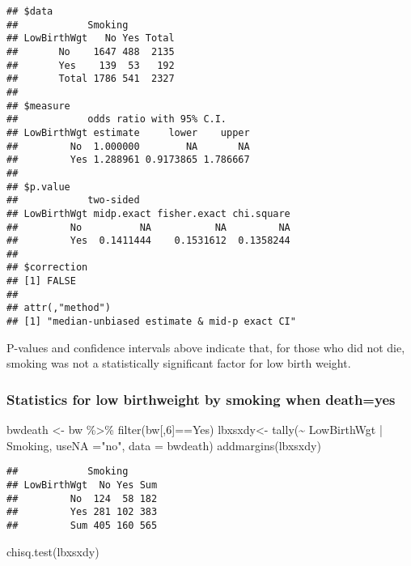\documentclass[
]{article}
\newenvironment{Shaded}{\begin{snugshade}}{\end{snugshade}}
\newcommand{\AttributeTok}[1]{\textcolor[rgb]{0.77,0.63,0.00}{#1}}
\newcommand{\DecValTok}[1]{\textcolor[rgb]{0.00,0.00,0.81}{#1}}
\newcommand{\FunctionTok}[1]{\textcolor[rgb]{0.00,0.00,0.00}{#1}}
\newcommand{\NormalTok}[1]{#1}
\newcommand{\OtherTok}[1]{\textcolor[rgb]{0.56,0.35,0.01}{#1}}
\newcommand{\SpecialCharTok}[1]{\textcolor[rgb]{0.00,0.00,0.00}{#1}}
\newcommand{\StringTok}[1]{\textcolor[rgb]{0.31,0.60,0.02}{#1}}
\begin{document}
\begin{verbatim}
## $data
##            Smoking
## LowBirthWgt   No Yes Total
##       No    1647 488  2135
##       Yes    139  53   192
##       Total 1786 541  2327
## 
## $measure
##            odds ratio with 95% C.I.
## LowBirthWgt estimate     lower    upper
##         No  1.000000        NA       NA
##         Yes 1.288961 0.9173865 1.786667
## 
## $p.value
##            two-sided
## LowBirthWgt midp.exact fisher.exact chi.square
##         No          NA           NA         NA
##         Yes  0.1411444    0.1531612  0.1358244
## 
## $correction
## [1] FALSE
## 
## attr(,"method")
## [1] "median-unbiased estimate & mid-p exact CI"
\end{verbatim}

P-values and confidence intervals above indicate that, for those who did
not die, smoking was not a statistically significant factor for low
birth weight.

\hypertarget{statistics-for-low-birthweight-by-smoking-when-deathyes}{%
\subsubsection{Statistics for low birthweight by smoking when
death=yes}\label{statistics-for-low-birthweight-by-smoking-when-deathyes}}

\begin{Shaded}
\begin{Highlighting}[]
\NormalTok{bwdeath }\OtherTok{\textless{}{-}}\NormalTok{ bw }\SpecialCharTok{\%\textgreater{}\%} \FunctionTok{filter}\NormalTok{(bw[,}\DecValTok{6}\NormalTok{]}\SpecialCharTok{==}\StringTok{\textquotesingle{}Yes\textquotesingle{}}\NormalTok{)}
\NormalTok{lbxsxdy}\OtherTok{\textless{}{-}} \FunctionTok{tally}\NormalTok{(}\SpecialCharTok{\textasciitilde{}}\NormalTok{ LowBirthWgt }\SpecialCharTok{|}\NormalTok{ Smoking, }\AttributeTok{useNA =}\StringTok{"no"}\NormalTok{, }\AttributeTok{data =}\NormalTok{ bwdeath)}
\FunctionTok{addmargins}\NormalTok{(lbxsxdy)}
\end{Highlighting}
\end{Shaded}

\begin{verbatim}
##            Smoking
## LowBirthWgt  No Yes Sum
##         No  124  58 182
##         Yes 281 102 383
##         Sum 405 160 565
\end{verbatim}

\begin{Shaded}
\begin{Highlighting}[]
\FunctionTok{chisq.test}\NormalTok{(lbxsxdy)}
\end{Highlighting}
\end{Shaded}
\end{document}

